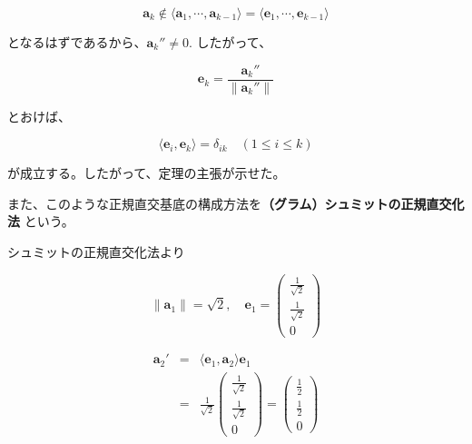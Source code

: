 \documentclass[dvipdfmx,autodetect-engine]{jsarticle}
\theoremstyle{definition}
\begin{document}
$$
\bm{a}_k \notin \langle \bm{a}_1, \cdots, \bm{a}_{k-1} \rangle = \langle \bm{e}_1, \cdots, \bm{e}_{k-1} \rangle
$$

となるはずであるから、$\bm{a}_k'' \neq 0$. したがって、

$$
\bm{e}_k = \frac{\bm{a}_k''}{\|\bm{a}_k''\|}
$$

とおけば、

$$
\langle \bm{e}_i, \bm{e}_k \rangle = \delta_{ik} \quad (1 \leq i \leq k)
$$

が成立する。したがって、定理の主張が示せた。

また、このような正規直交基底の構成方法を{\bf（グラム）シュミットの正規直交化法 }という。
{\bf \newline}







シュミットの正規直交化法より

$$
\|\bm{a}_1\| = \sqrt{2}, \quad \bm{e}_1 = \begin{pmatrix}
\frac{1}{\sqrt{2}} \\[1.5ex]
\frac{1}{\sqrt{2}} \\[1.5ex]
0
\end{pmatrix}
$$

\begin{eqnarray*}
\bm{a}_2' &= &\langle \bm{e}_1, \bm{a}_2 \rangle \bm{e}_1 \\[1.5ex]
&=& \frac{1}{\sqrt{2}} \begin{pmatrix}
\frac{1}{\sqrt{2}} \\[1.5ex]
\frac{1}{\sqrt{2}} \\[1.5ex]
0
\end{pmatrix} = \begin{pmatrix}
\frac{1}{2}  \\[1.5ex]
\frac{1}{2}  \\[1.5ex]
0
\end{pmatrix}
\end{eqnarray*}
\end{document}
